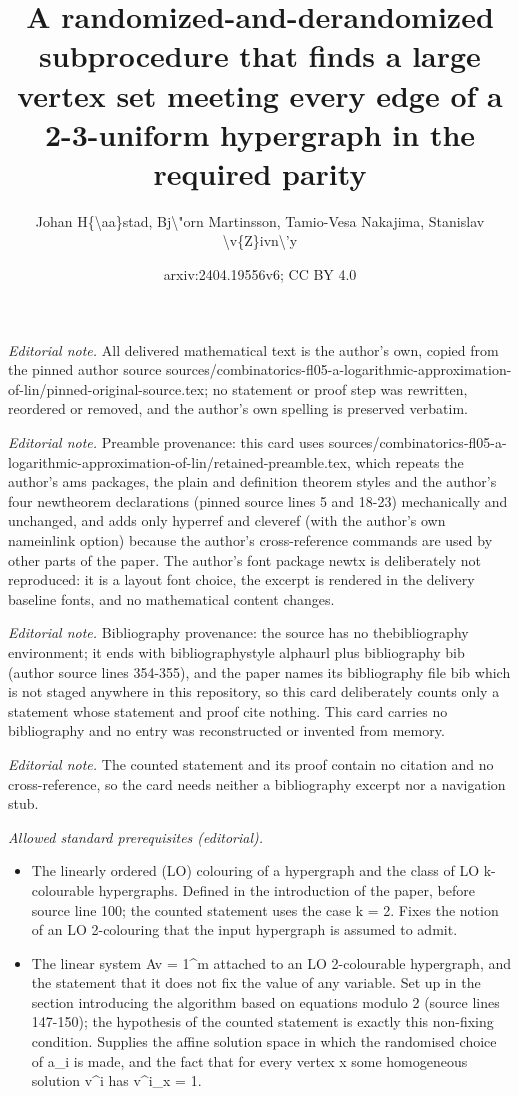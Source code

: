 \documentclass[10pt,a4paper]{article}
\title{A randomized-and-derandomized subprocedure that finds a large vertex set meeting every edge of a 2-3-uniform hypergraph in the required parity}
\author{Johan H\{\textbackslash{}aa\}stad, Bj\textbackslash{}"orn Martinsson, Tamio-Vesa Nakajima, Stanislav \textbackslash{}v\{Z\}ivn\textbackslash{}'y}
\date{arxiv:2404.19556v6; CC BY 4.0}
\theoremstyle{plain}
\theoremstyle{definition}
\begin{document}
\maketitle
\noindent\textit{Editorial note.} All delivered mathematical text is the author's own, copied from the pinned author source sources/combinatorics-fl05-a-logarithmic-approximation-of-lin/pinned-original-source.tex; no statement or proof step was rewritten, reordered or removed, and the author's own spelling is preserved verbatim.\par\medskip
\noindent\textit{Editorial note.} Preamble provenance: this card uses sources/combinatorics-fl05-a-logarithmic-approximation-of-lin/retained-preamble.tex, which repeats the author's ams packages, the plain and definition theorem styles and the author's four newtheorem declarations (pinned source lines 5 and 18-23) mechanically and unchanged, and adds only hyperref and cleveref (with the author's own nameinlink option) because the author's cross-reference commands are used by other parts of the paper. The author's font package newtx is deliberately not reproduced: it is a layout font choice, the excerpt is rendered in the delivery baseline fonts, and no mathematical content changes.\par\medskip
\noindent\textit{Editorial note.} Bibliography provenance: the source has no thebibliography environment; it ends with bibliographystyle alphaurl plus bibliography bib (author source lines 354-355), and the paper names its bibliography file bib which is not staged anywhere in this repository, so this card deliberately counts only a statement whose statement and proof cite nothing. This card carries no bibliography and no entry was reconstructed or invented from memory.\par\medskip
\noindent\textit{Editorial note.} The counted statement and its proof contain no citation and no cross-reference, so the card needs neither a bibliography excerpt nor a navigation stub.\par\medskip
\noindent\textit{Allowed standard prerequisites (editorial).}\begin{itemize}
\item The linearly ordered (LO) colouring of a hypergraph and the class of LO k-colourable hypergraphs. Defined in the introduction of the paper, before source line 100; the counted statement uses the case k = 2. Fixes the notion of an LO 2-colouring that the input hypergraph is assumed to admit.
\item The linear system Av = 1\textasciicircum{}m attached to an LO 2-colourable hypergraph, and the statement that it does not fix the value of any variable. Set up in the section introducing the algorithm based on equations modulo 2 (source lines 147-150); the hypothesis of the counted statement is exactly this non-fixing condition. Supplies the affine solution space in which the randomised choice of a\_i is made, and the fact that for every vertex x some homogeneous solution v\textasciicircum{}i has v\textasciicircum{}i\_x = 1.
\end{itemize}\medskip
\end{document}
